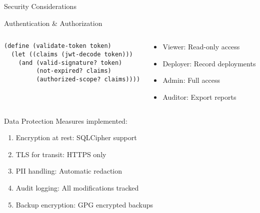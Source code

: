 \documentclass[presentation,aspectratio=169]{beamer}
\begin{document}
\begin{frame}[label={sec:org16b6387},fragile]{Security Considerations}
 \begin{block}{Authentication \& Authorization}
\begin{columns}
\begin{column}{0.5\columnwidth}
\begin{verbatim}
(define (validate-token token)
  (let ((claims (jwt-decode token)))
    (and (valid-signature? token)
         (not-expired? claims)
         (authorized-scope? claims))))
\end{verbatim}
\end{column}
\begin{column}{0.5\columnwidth}
\begin{itemize}
\item Viewer: Read-only access
\item Deployer: Record deployments
\item Admin: Full access
\item Auditor: Export reports
\end{itemize}
\end{column}
\end{columns}
\end{block}
\begin{block}{Data Protection}
Measures implemented:
\begin{enumerate}
\item \alert{\alert{Encryption at rest}}: SQLCipher support
\item \alert{\alert{TLS for transit}}: HTTPS only
\item \alert{\alert{PII handling}}: Automatic redaction
\item \alert{\alert{Audit logging}}: All modifications tracked
\item \alert{\alert{Backup encryption}}: GPG encrypted backups
\end{enumerate}
\end{block}
\end{frame}
\end{document}
